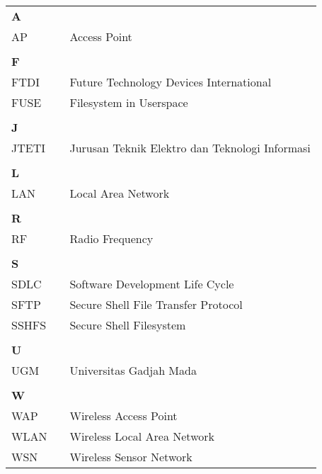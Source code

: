 \documentclass{jtetiskripsi}
\begin{document}
\singkatan
\noindent
\begin{tabular}{lp{3pt}l}

\textbf{A}\\
AP & & Access Point\\
\\

\textbf{F}\\
FTDI & & Future Technology Devices International\\
FUSE & & Filesystem in Userspace\\
\\

\textbf{J}\\
JTETI & & Jurusan Teknik Elektro dan Teknologi Informasi\\
\\

\textbf{L}\\
LAN & & Local Area Network\\
\\

\textbf{R}\\
RF & & Radio Frequency\\
\\

\textbf{S}\\
SDLC & & Software Development Life Cycle\\
SFTP & & Secure Shell File Transfer Protocol\\
SSHFS & & Secure Shell Filesystem\\
\\

\textbf{U}\\
UGM & & Universitas Gadjah Mada\\
\\

\textbf{W}\\
WAP & & Wireless Access Point\\
WLAN & & Wireless Local Area Network\\
WSN & & Wireless Sensor Network\\

\end{tabular}
\end{document}

